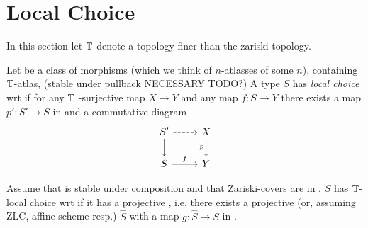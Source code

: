 
\section{Local Choice}
In this section let $\mathbb{T}$ denote a topology finer than the zariski topology.
\begin{definition}
	Let \Cov be a class of morphisms (which we think of $n$-atlasses of some $n$), containing $\mathbb{T}$-atlas, (stable under pullback NECESSARY TODO?)
	A type $S$ has \emph{local choice} wrt \Cov if for any $\mathbb{T}$ -surjective map $X \to Y$ and any map $f : S \to Y$ there exists a map  $p' : S' \to S$ in \Cov and a commutative diagram
	\[\begin{tikzcd}
		{S'} & X \\
		S & Y
		\arrow[dashed, from=1-1, to=1-2]
		\arrow[from=1-1, to=2-1]
		\arrow["p"', from=1-2, to=2-2]
		\arrow["f",from=2-1, to=2-2]
	\end{tikzcd}\]
\end{definition}
\begin{prop}{\label{prop:LocalChoice}}
	Assume that \Cov is stable under composition and that Zariski-covers are in \Cov.
	$S$ has  $\mathbb{T}$-local choice wrt \Cov if it has a projective \Cover, i.e. there exists a projective (or, assuming ZLC, affine scheme resp.)  $\hat{S}$ with a map $g : \hat{S} \to S$ in \Cov. %
\end{prop}
